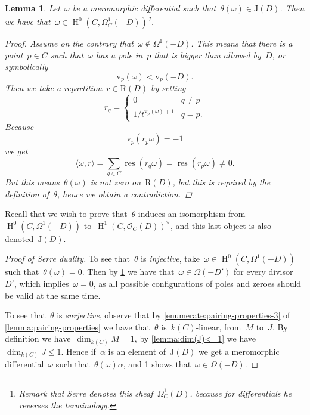 \documentclass[10pt,a4paper]{article}
\theoremstyle{lecture}
\newtheorem{lemma}[theorem]{Lemma}
\newcommand\dash{\nobreakdash-\hspace{0pt}}
\DeclareMathOperator\HH{H}
\DeclareMathOperator\res{res}
\begin{document}
\begin{lemma}
  \label{lemma:theta-J(D)}
  Let~$\omega$ be a meromorphic differential such that~$\theta(\omega)\in\mathrm{J}(D)$. Then we have that~$\omega\in\HH^0(C,\Omega_C^1(-D))$\footnote{Remark that Serre denotes this sheaf~$\Omega_C^1(D)$, because for differentials he reverses the terminology.}.

  \begin{proof}
    Assume on the contrary that~$\omega\notin\Omega^1(-D)$. This means that there is a point~$p\in C$ such that~$\omega$ has a pole in~$p$ that is bigger than allowed by~$D$, or symbolically
    \begin{equation}
      \mathrm{v}_p(\omega)<\mathrm{v}_p(-D).
    \end{equation}
    Then we take a repartition~$r\in\mathrm{R}(D)$ by setting
    \begin{equation}
      r_q=
      \begin{cases}
        0 & q\neq p \\
        1/t^{\mathrm{v}_p(\omega)+1} & q=p.
      \end{cases}
    \end{equation}
    Because
    \begin{equation}
      \mathrm{v}_p(r_p\omega)=-1
    \end{equation}
    we get
    \begin{equation}
      \langle\omega,r\rangle=\sum_{q\in C}\res(r_q\omega)=\res(r_p\omega)\neq 0.
    \end{equation}
    But this means~$\theta(\omega)$ is not zero on~$\mathrm{R}(D)$, but this is required by the definition of~$\theta$, hence we obtain a contradiction.
  \end{proof}
\end{lemma}

Recall that we wish to prove that~$\theta$ induces an isomorphism from~$\HH^0(C,\Omega^1(-D))$ to~$\HH^1(C,\mathcal{O}_C(D))^\vee$, and this last object is also denoted~$\mathrm{J}(D)$.
\begin{proof}[Proof of Serre duality]
  To see that~$\theta$ is \emph{injective}, take~$\omega\in\HH^0(C,\Omega^1(-D))$ such that~$\theta(\omega)=0$. Then by \cref{lemma:theta-J(D)} we have that~$\omega\in\Omega(-D')$ for every divisor~$D'$, which implies~$\omega=0$, as all possible configurations of poles and zeroes should be valid at the same time.

  To see that~$\theta$ is \emph{surjective}, observe that by \cref{enumerate:pairing-properties-3} of \cref{lemma:pairing-properties} we have that~$\theta$ is~$k(C)$\dash linear, from~$M$ to~$J$. By definition we have~$\dim_{k(C)}M=1$, by \cref{lemma:dim(J)<=1} we have~$\dim_{k(C)}J\leq 1$. Hence if~$\alpha$ is an element of~$\mathrm{J}(D)$ we get a meromorphic differential~$\omega$ such that~$\theta(\omega)\alpha$, and \cref{lemma:theta-J(D)} shows that~$\omega\in\Omega(-D)$.
\end{proof}
\end{document}
